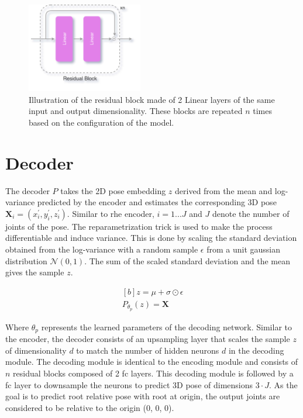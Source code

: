 \begin{figure}[h] \label{fig:residual_block}
    \centering
    \includegraphics[width=0.45\textwidth]{figures/arch/res_block.png}
    \caption{Illustration of the residual block made of 2 Linear layers of the same input and output dimensionality. These blocks are repeated $n$ times based on the configuration of the model.
    }
\end{figure}

\section{Decoder}

The decoder $P$ takes the 2D pose embedding $z$ derived from the mean and log-variance predicted by the encoder and estimates the corresponding 3D pose $\textbf{X}_i = (x^\prime_i, y^\prime_i, z^\prime_i)$. Similar to rhe encoder, $i = 1 ... J$ and $J$ denote the number of joints of the pose. The reparametrization trick is used to make the process differentiable and induce variance. This is done by scaling the standard deviation obtained from the log-variance with a random sample $\epsilon$ from a unit gaussian distribution $\mathcal{N}(0,1)$. The sum of the scaled standard deviation and the mean gives the sample $z$.

\begin{equation} \label{eqn:P_fn}
    \begin{gathered}[b]
        z = \mu + \sigma \odot \epsilon \\
        P_{\theta_p}(z) = \textbf{X}
    \end{gathered}
\end{equation}

Where $\theta_p$ represents the learned parameters of the decoding network. Similar to the encoder, the decoder consists of an upsampling layer that scales the sample $z$ of dimensionality $d$ to match the number of hidden neurons $d$ in the decoding module. The decoding module is identical to the encoding module and consists of $n$ residual blocks composed of 2 \ac{fc} layers. This decoding module is followed by a \ac{fc} layer to downsample the neurons to predict 3D pose of dimensions $3\!\cdot\!J$. As the goal is to predict root relative pose with root at origin, the output joints are considered to be relative to the origin (0, 0, 0).

